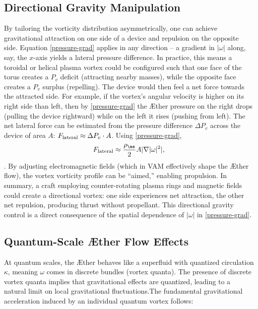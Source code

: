 \subsection*{Directional Gravity Manipulation}
By tailoring the vorticity distribution asymmetrically, one can achieve gravitational attraction on one side of a device and repulsion on the opposite side. Equation \eqref{pressure-grad} applies in any direction – a gradient in $|\omega|$ along, say, the $x$-axis yields a lateral pressure difference. In practice, this means a toroidal or helical plasma vortex could be configured such that one face of the torus creates a $P_v$ deficit (attracting nearby masses), while the opposite face creates a $P_v$ surplus (repelling). The device would then feel a net force towards the attracted side. For example, if the vortex’s angular velocity is higher on its right side than left, then by \eqref{pressure-grad} the Æther pressure on the right drops (pulling the device rightward) while on the left it rises (pushing from left). The net lateral force can be estimated from the pressure difference $\Delta P_v$ across the device of area $A$: $F_{\rm lateral}\approx \Delta P_v \cdot A$. Using \eqref{pressure-grad},
\begin{equation}
    F_{\text{lateral}} \approx \frac{\rho_{\ae}}{2} A |\nabla |\omega|^2|,
    \label{eq:lateral_force}
\end{equation}
. By adjusting electromagnetic fields (which in VAM effectively shape the Æther flow), the vortex vorticity profile can be “aimed,” enabling propulsion. In summary, a craft employing counter-rotating plasma rings and magnetic fields could create a directional vortex: one side experiences net attraction, the other net repulsion, producing thrust without propellant. This directional gravity control is a direct consequence of the spatial dependence of $|\omega|$ in \eqref{pressure-grad}.

\subsection*{Quantum-Scale Æther Flow Effects}
At quantum scales, the Æther behaves like a superfluid with quantized circulation $\kappa$, meaning $\omega$ comes in discrete bundles (vortex quanta). The presence of discrete vortex quanta implies that gravitational effects are quantized, leading to a natural limit on local gravitational fluctuations.The fundamental gravitational acceleration induced by an individual quantum vortex follows:

